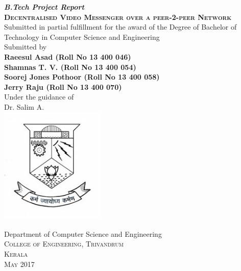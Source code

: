 \documentclass[a4paper,11pt]{article}
\begin{document}
	\begin{titlepage}
		\begin{centering}
		 
		\textbf{\textit{\large{B.Tech Project Report}}}\\[0.5cm]
		
		\textsc{\textbf{\LARGE{Decentralised Video Messenger
over a peer-2-peer Network }}}\\[1.5cm]

		\large{Submitted in partial fulfillment for the award of the Degree of Bachelor of Technology in Computer Science and Engineering}\\[1.5cm]

		\large{Submitted by}\\[0.5cm]

		\textbf{Raeesul Asad     (Roll No 13 400 046)}\\
		\textbf{Shamnas T. V.     (Roll No 13 400 054)}\\
                \textbf{Soorej Jones Pothoor     (Roll No 13 400 058)}\\
		\textbf{Jerry Raju     (Roll No 13 400 070)}\\[1.5cm]
		
		{Under the guidance of}\\[0.25cm]
		\large{Dr. Salim A.}\\[0.5cm]

		\includegraphics[width=5cm]{images/logo.jpg} 

		Department of Computer Science and Engineering\\
		\textsc{College of Engineering, Trivandrum}\\
		\textsc{Kerala}\\
		\textsc{May 2017}\\
		\vfill %
		\end{centering}
	\end{titlepage}
\end{document}
